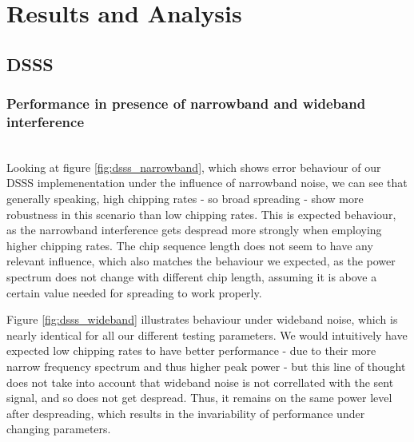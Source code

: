 \section{Results and Analysis}

	\subsection{DSSS}
	
		\subsubsection{Performance in presence of narrowband and wideband interference}~\\

	Looking at figure \ref{fig:dsss_narrowband}, which shows error behaviour of our DSSS implemenentation under the influence of narrowband noise, we can see that generally speaking, high chipping rates - so broad spreading - show more robustness in this scenario than low chipping rates. This is expected behaviour, as the narrowband interference gets despread more strongly when employing higher chipping rates. The chip sequence length does not seem to have any relevant influence, which also matches the behaviour we expected, as the power spectrum does not change with different chip length, assuming it is above a certain value needed for spreading to work properly.
	
	Figure \ref{fig:dsss_wideband} illustrates behaviour under wideband noise, which is nearly identical for all our different testing parameters. We would intuitively have expected low chipping rates to have better performance - due to their more narrow frequency spectrum and thus higher peak power - but this line of thought does not take into account that wideband noise is not correllated with the sent signal, and so does not get despread. Thus, it remains on the same power level after despreading, which results in the invariability of performance under changing parameters.
	

